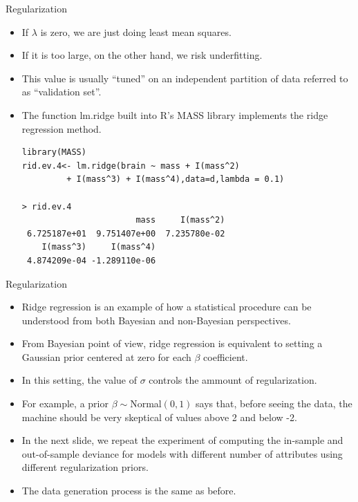 \documentclass[handout]{beamer}
\begin{document}
\begin{frame}[fragile]{Regularization}
\scriptsize{

\begin{itemize}

\item If $\lambda$ is zero, we are just doing least mean squares.

\item If it is too large, on the other hand, we risk underfitting.

\item This value is usually ``tuned'' on an independent partition of data referred to as ``validation set''. 

\item The function lm.ridge built into R's MASS library implements the ridge regression method. 

\begin{verbatim}
library(MASS)
rid.ev.4<- lm.ridge(brain ~ mass + I(mass^2)
         + I(mass^3) + I(mass^4),data=d,lambda = 0.1) 

> rid.ev.4
                       mass     I(mass^2) 
 6.725187e+01  9.751407e+00  7.235780e-02 
    I(mass^3)     I(mass^4) 
 4.874209e-04 -1.289110e-06         
\end{verbatim}



\end{itemize}


} 
\end{frame}

\begin{frame}{Regularization}
\scriptsize{

\begin{itemize}

\item Ridge regression is an example of how a statistical procedure can be understood from both Bayesian and non-Bayesian perspectives.

\item From Bayesian point of view, ridge regression is equivalent to setting a Gaussian prior centered at zero for each $\beta$ coefficient.

\item In this setting, the value of $\sigma$ controls the ammount of regularization.

\item For example, a prior $\beta \sim $Normal$(0, 1)$ says that, before seeing the data, the machine should be very skeptical of values above 2 and below -2.

\item In the next slide, we repeat the experiment of computing  the in-sample and out-of-sample deviance for models with different number of attributes using different regularization priors.

\item The data generation process is the same as before.

\end{itemize}


} 
\end{frame}
\end{document}
